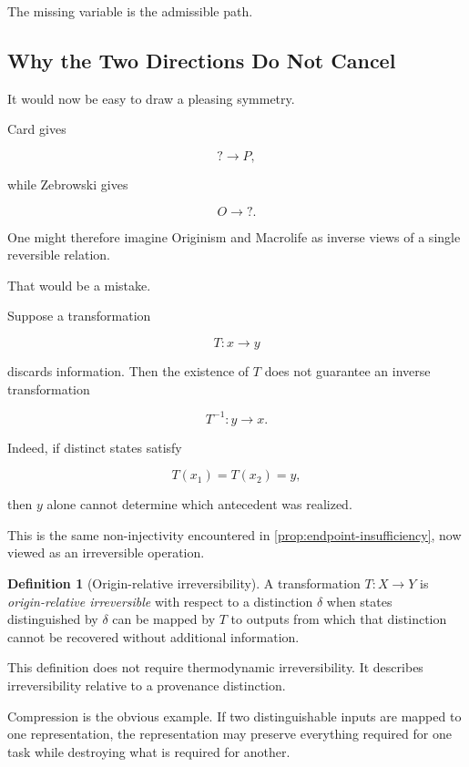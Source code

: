 \documentclass[
  11pt,
  a4paper,
  DIV=12,
  BCOR=0mm,
  parskip=half-
]{scrartcl}
\theoremstyle{definition}
\newtheorem{definition}{Definition}[section]
\theoremstyle{plain}
\theoremstyle{remark}
\begin{document}
The missing variable is the admissible path.


\subsection{Why the Two Directions Do Not Cancel}
\label{sec:irreversibility}

It would now be easy to draw a pleasing symmetry.

Card gives

\[
  ?\longrightarrow P,
\]

while Zebrowski gives

\[
  O\longrightarrow ?.
\]

One might therefore imagine Originism and Macrolife as inverse views of a
single reversible relation.

That would be a mistake.

Suppose a transformation

\[
  T:x\longrightarrow y
\]

discards information. Then the existence of \(T\) does not guarantee an
inverse transformation

\[
  T^{-1}:y\longrightarrow x.
\]

Indeed, if distinct states satisfy

\[
  T(x_1)=T(x_2)=y,
\]

then \(y\) alone cannot determine which antecedent was realized.

This is the same non-injectivity encountered in
\cref{prop:endpoint-insufficiency}, now viewed as an irreversible operation.

\begin{definition}[Origin-relative irreversibility]
\label{def:irreversibility}
A transformation \(T:X\rightarrow Y\) is
\emph{origin-relative irreversible} with respect to a distinction
\(\delta\) when states distinguished by \(\delta\) can be mapped by \(T\)
to outputs from which that distinction cannot be recovered without
additional information.
\end{definition}

This definition does not require thermodynamic irreversibility. It describes
irreversibility relative to a provenance distinction.

Compression is the obvious example. If two distinguishable inputs are mapped
to one representation, the representation may preserve everything required
for one task while destroying what is required for another.
\end{document}
